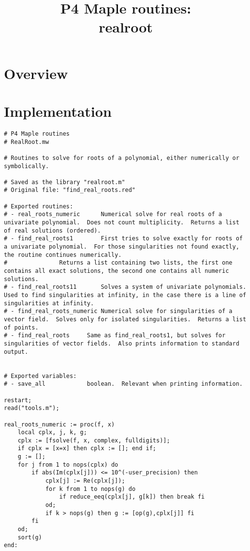 \documentclass[a4paper,10pt]{article}
\title{P4 Maple routines:\\realroot}
\author{}
\date{}
\begin{document}
\maketitle

\section{Overview}

\section{Implementation}

\begin{lstlisting}[name=realroot]
# P4 Maple routines
# RealRoot.mw

# Routines to solve for roots of a polynomial, either numerically or symbolically.

# Saved as the library "realroot.m"
# Original file: "find_real_roots.red"

# Exported routines:
# - real_roots_numeric      Numerical solve for real roots of a univariate polynomial.  Does not count multiplicity.  Returns a list of real solutions (ordered).
# - find_real_roots1        First tries to solve exactly for roots of a univariate polynomial.  For those singularities not found exactly, the routine continues numerically.
#               Returns a list containing two lists, the first one contains all exact solutions, the second one contains all numeric solutions.
# - find_real_roots11       Solves a system of univariate polynomials.  Used to find singularities at infinity, in the case there is a line of singularities at infinity.
# - find_real_roots_numeric Numerical solve for singularities of a vector field.  Solves only for isolated singularities.  Returns a list of points.
# - find_real_roots     Same as find_real_roots1, but solves for singularities of vector fields.  Also prints information to standard output.


# Exported variables:
# - save_all            boolean.  Relevant when printing information.

restart;
read("tools.m");

real_roots_numeric := proc(f, x)
    local cplx, j, k, g;
    cplx := [fsolve(f, x, complex, fulldigits)];
    if cplx = [x=x] then cplx := []; end if;
    g := [];
    for j from 1 to nops(cplx) do
        if abs(Im(cplx[j])) <= 10^(-user_precision) then
            cplx[j] := Re(cplx[j]);
            for k from 1 to nops(g) do
                if reduce_eeq(cplx[j], g[k]) then break fi
            od;
            if k > nops(g) then g := [op(g),cplx[j]] fi
        fi
    od;
    sort(g)
end:


\end{lstlisting}
\end{document}
